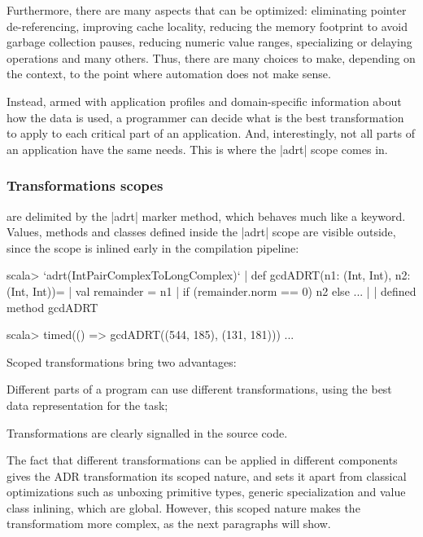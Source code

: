 Furthermore, there are many aspects that can be optimized: eliminating pointer de-referencing, improving cache locality, reducing the memory footprint to avoid garbage collection pauses, reducing numeric value ranges, specializing or delaying operations and many others. Thus, there are many choices to make, depending on the context, to the point where automation does not make sense.

Instead, armed with application profiles and domain-specific information about how the data is used, a programmer can decide what is the best transformation to apply to each critical part of an application. And, interestingly, not all parts of an application have the same needs. This is where the |adrt| scope comes in.

\subsubsection{Transformations scopes} are delimited by the |adrt| marker method, which behaves much like a keyword. Values, methods and classes defined inside the |adrt| scope are visible outside, since the scope is inlined early in the compilation pipeline:

\begin{lstlisting-nobreak}
scala> `adrt(IntPairComplexToLongComplex)` {
       |   def gcdADRT(n1: (Int, Int), n2: (Int, Int))={
       |     val remainder = n1 %
       |     if (remainder.norm == 0) n2 else ...
       |   }
       | }
defined method gcdADRT

scala> timed(() => gcdADRT((544, 185), (131, 181)))
...
\end{lstlisting-nobreak}

Scoped transformations bring two advantages:

\begin{compactitem}
 \item Different parts of a program can use different transformations, using the best data representation for the task;
 \item Transformations are clearly signalled in the source code.
\end{compactitem}

The fact that different transformations can be applied in different components gives the ADR transformation its scoped nature, and sets it apart from classical optimizations such as unboxing primitive types, generic specialization and value class inlining, which are global. However, this scoped nature makes the transformatiom more complex, as the next paragraphs will show.

